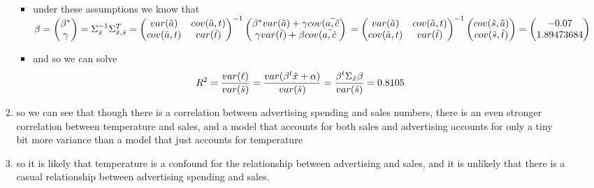 \documentclass[12pt,twoside]{article}
\begin{document}
\begin{enumerate}
\begin{itemize}
\begin{enumerate}
\begin{itemize}
            \item under these assumptions we know that $\beta = 
            \begin{pmatrix}
                \beta^{*}\\\gamma
            \end{pmatrix}= \Sigma_{\Tilde{x}}^{-1}\Sigma_{\Tilde{x}, \Tilde{s}}^{T}\\=\begin{pmatrix}
                var(\Tilde{a}) & cov(\Tilde{a}, t)\\
                cov(\Tilde{a}, t) & var(\Tilde{t})
            \end{pmatrix}^{-1} \begin{pmatrix}
                \beta^{*}var(\Tilde{a}) + \gamma cov(\Tilde{a,\Tilde{c}}\\ 
                \gamma var(\Tilde{t}) + \beta cov(\Tilde{a,\Tilde{c}}
            \end{pmatrix}\\ =\begin{pmatrix}
                var(\Tilde{a}) & cov(\Tilde{a}, t)\\
                cov(\Tilde{a}, t) & var(\Tilde{t})
            \end{pmatrix}^{-1} \begin{pmatrix}
                cov(\Tilde{s}, \Tilde{a})\\ 
                cov(\Tilde{s}, \Tilde{t})
            \end{pmatrix}=\begin{pmatrix}
                {-0.07}\\{1.89473684}
            \end{pmatrix}$
            \item and so we can solve $$R^2= \frac{var(\ell )}{var(\Tilde{s})}=\frac{var(\beta^t\Tilde{x}+\alpha)}{var(\Tilde{s})}=\frac{\beta^t\Sigma_{\Tilde{x}}\beta}{var(\Tilde{s})} = 0.8105$$
        \end{itemize}
        \item so we can see that though there is a correlation between advertising spending and sales numbers, there is an even stronger correlation between temperature and sales, and a model that accounts for both sales and advertising accounts for only a tiny bit more variance than a model that just accounts for temperature 
        \item so it is likely that temperature is a confound for the relationship between advertising and sales, and it is unlikely that there is a casual relationship between advertising spending and sales. 
        

\end{enumerate}
\end{itemize}
\end{enumerate}
\end{document}
